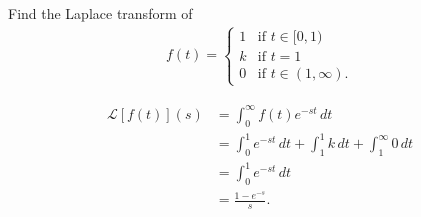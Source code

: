 \documentclass[12pt, a4paper]{article}
\newcommand{\CL}{\mathcal{L}}
\begin{document}
\begin{mdexample}
    Find the Laplace transform of 
    \[\begin{aligned}
        f(t) = \begin{cases}
            1 &\text{if } t \in [0,1) \\
            k &\text{if } t=1 \\
            0 &\text{if } t \in (1,\infty).
        \end{cases}
    \end{aligned}\]
    \begin{solution}
        \[\begin{aligned}
            \CL[f(t)](s) &= \int_{0}^{\infty} f(t)e^{-st} \,dt \\
            &= \int_{0}^{1} e^{-st} \, dt + \int_{1}^{1} k \, dt + \int_{1}^{\infty} 0 \, dt \\
            &= \int_{0}^{1} e^{-st} \, dt \\\
            &= \frac{1-e^{-s}}{s}.
        \end{aligned}\]
    \end{solution}
\end{mdexample}
\end{document}
